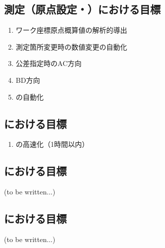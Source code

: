 \clearpage


\subsection{測定（原点設定・\CenterlineEndFaceDif）における目標\TBW}
\begin{enumerate}
\item ワーク座標原点概算値の解析的導出
\item 測定箇所変更時の数値変更の自動化
\item \AsideKeywayDepth 公差指定時のAC方向\KeywayCenterMeasurement
\item BD方向\KeywayCenterMeasurement
\item \CenterlineEndFaceDifMeasurement の自動化
\end{enumerate}


\subsection{\DimpleMeasurement における目標\TBW}
\begin{enumerate}
\item \DimpleMeasurement の高速化（1時間以内）
\end{enumerate}



\subsection{\DimpleMilling における目標\TBW}
(to be written...)


\subsection{\EndFacecutMilling における目標\TBW}
(to be written...)



